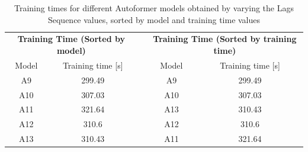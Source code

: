 \begin{table}[]
    \begin{tabular}{ccccc}
    \multicolumn{2}{c}{\textbf{Training   Time (Sorted by model)}} &  & \multicolumn{2}{c}{\textbf{Training Time (Sorted   by training time)}} \\
    Model             & Training time {[}s{]}                      &  & Model                 & Training time {[}s{]}                          \\
    A9                & \cellcolor[HTML]{63BE7B}299.49             &  & A9                    & \cellcolor[HTML]{63BE7B}299.49                 \\
    A10               & \cellcolor[HTML]{CEDD81}307.03             &  & A10                   & \cellcolor[HTML]{CEDD81}307.03                 \\
    A11               & \cellcolor[HTML]{F8696B}321.64             &  & A13                   & \cellcolor[HTML]{FFEB84}310.43                 \\
    A12               & \cellcolor[HTML]{FFEA84}310.6              &  & A12                   & \cellcolor[HTML]{FFEA84}310.6                  \\
    A13               & \cellcolor[HTML]{FFEB84}310.43             &  & A11                   & \cellcolor[HTML]{F8696B}321.64                
    \end{tabular}
    \caption{Training times for different Autoformer models obtained  by varying the Lags Sequence values, sorted by model and training time values}
    \label{A2_T}
    \end{table}


